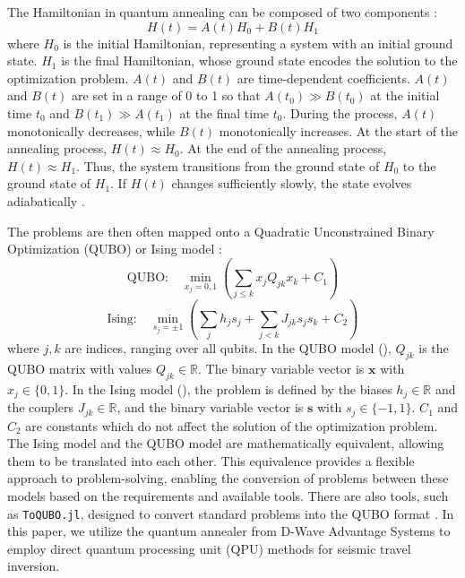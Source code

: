 The Hamiltonian in quantum annealing can be composed of two components \cite{rajak23, biswas17}:
\begin{equation}
H(t) = A(t) H_0 + B(t) H_1
\end{equation}
where \( H_0 \) is the initial Hamiltonian, representing a system with an initial ground state. \( H_1 \) is the final Hamiltonian, whose ground state encodes the solution to the optimization problem. \( A(t) \) and \( B(t) \) are time-dependent coefficients. \( A(t) \) and \( B(t) \) are set in a range of 0 to 1 so that \( A(t_0) \gg B(t_0) \) at the initial time \( t_0 \) and \( B(t_1) \gg A(t_1) \) at the final time \( t_0 \). During the process, \( A(t) \) monotonically decreases, while \( B(t) \) monotonically increases. At the start of the annealing process, \( H(t) \approx H_0 \). At the end of the annealing process, \( H(t) \approx H_1 \). Thus, the system transitions from the ground state of \( H_0 \) to the ground state of \( H_1 \). If \( H(t) \) changes sufficiently slowly, the state evolves adiabatically \cite{hauke20}.

The problems are then often mapped onto a Quadratic Unconstrained Binary Optimization (QUBO) or Ising model \cite{willsch22}:
\begin{equation}
\text{QUBO:} \quad \min_{x_j = 0,1} \left( \sum_{j \leq k} x_j Q_{jk} x_k + C_1 \right)
\label{eq:ch3-qubo}
\end{equation}
\begin{equation}
\text{Ising:} \quad \min_{s_j = \pm1} \left( \sum_j h_j s_j + \sum_{j < k} J_{jk} s_j s_k + C_2 \right)
\label{eq:ch3-ising}
\end{equation}
where \(j, k\) are indices, ranging over all qubits. In the QUBO model (), \(Q_{jk}\) is the QUBO matrix with values \(Q_{jk} \in \mathbb{R}\). The binary variable vector is \(\mathbf{x}\) with \(x_j \in \{0, 1\}\). In the Ising model (), the problem is defined by the biases \(h_j \in \mathbb{R}\) and the couplers \(J_{jk} \in \mathbb{R}\), and the binary variable vector is \(\mathbf{s}\) with \(s_j \in \{-1, 1\}\). \(C_1\) and \(C_2\) are constants which do not affect the solution of the optimization problem. The Ising model and the QUBO model are mathematically equivalent, allowing them to be translated into each other. This equivalence provides a flexible approach to problem-solving, enabling the conversion of problems between these models based on the requirements and available tools. There are also tools, such as \texttt{ToQUBO.jl}, designed to convert standard problems into the QUBO format \cite{toqubo23}. In this paper, we utilize the quantum annealer from D-Wave Advantage Systems \cite{mcgeoch2020d} to employ direct quantum processing unit (QPU) methods for seismic travel inversion.

